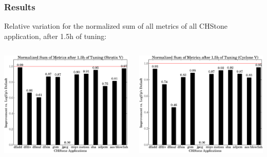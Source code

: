 \documentclass[10pt, compress, aspectratio=169]{beamer}
\begin{document}
\begin{frame}
    \frametitle{Results}
    Relative variation for the \alert{normalized sum of all metrics}
    of all CHStone application, after \alert{1.5h of tuning}:
    \begin{columns}[T,onlytextwidth]
        \begin{center}
            \includegraphics[width=.92\textwidth]{nsam_5400_chstone_StratixV}
        \end{center}

        \begin{center}
            \includegraphics[width=.92\textwidth]{nsam_5400_chstone_CycloneV}
        \end{center}

    \end{columns}
\end{frame}
\end{document}
